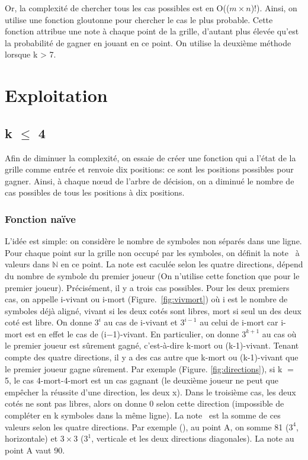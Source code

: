 \documentclass[12pt, a4paper]{article}
\begin{document}
Or, la complexité de chercher tous les cas possibles est en O(($m \times n$)!). Ainsi, on utilise une fonction gloutonne pour chercher le cas le plus probable. Cette fonction attribue une note à chaque point de la grille, d'autant plus élevée qu'est la probabilité de gagner en jouant en ce point.
On utilise la deuxième méthode lorsque k > 7.


\section{Exploitation}
\subsection{k $\le$ 4}
Afin de diminuer la complexité, on essaie de créer une fonction qui a l'état de la grille comme entrée et renvoie dix positions: ce sont les positions possibles pour gagner. Ainsi, à chaque nœud de l'arbre de décision, on a diminué le nombre de cas possibles de tous les positions à dix positions.
\subsubsection{Fonction naïve}
L'idée est simple: on considère le nombre de symboles non séparés dans une ligne. 
Pour chaque point sur la grille non occupé par les symboles, on définit la \og note \fg \ à valeurs dans $\mathbb{N}$ en ce point. La note est caculée selon les quatre directions, dépend du nombre de symbole du premier joueur (On n'utilise cette fonction que pour le premier joueur). Précisément, il y a trois cas possibles. Pour les deux premiers cas, on appelle i-vivant ou i-mort (\mbox{Figure. \ref{fig:vivmort}}) où i est le nombre de symboles déjà aligné, vivant si les deux cotés sont libres, mort si seul un des deux coté est libre. On donne $3^{i}$ au cas de i-vivant et $3^{i-1}$ au celui de i-mort car i-mort est en effet le cas de (i$-$1)-vivant. En particulier, on donne $3^{k+1}$ au cas où le premier joueur est sûrement gagné, c'est-à-dire k-mort ou (k-1)-vivant. Tenant compte des quatre directions, il y a des cas autre que k-mort ou (k-1)-vivant que le premier joueur gagne sûrement. Par exemple (Figure. \ref{fig:directions}), si k $=$ 5, le cas 4-mort-4-mort est un cas gagnant (le deuxième joueur ne peut que empêcher la réussite d'une direction, les deux x). Dans le troisième cas, les deux cotés ne sont pas libres, alors on donne 0 selon cette direction (impossible de compléter en k symboles dans la même ligne). La \og note \fg \ est la somme de ces valeurs selon les quatre directions. Par exemple (), au point A, on somme 81 ($3^{4}$, horizontale) et $3\times 3$ ($3^1$, verticale et les deux directions diagonales). La note au point A vaut 90.\par
\end{document}
